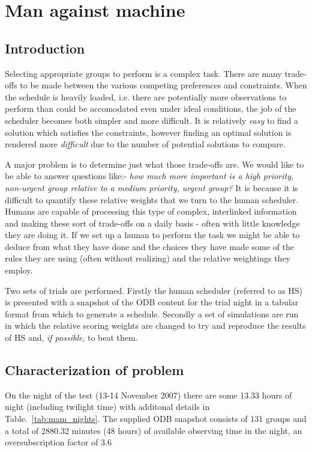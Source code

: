 \section{Man against machine}
\label{sect:mam_study}
\subsection{Introduction}Selecting appropriate groups to perform is a complex task. There are many trade-offs to be made between the various competing preferences and constraints. When the schedule is heavily loaded, i.e. there are potentially more observations to perform than could be accomodated even under ideal conditions, the job of the scheduler becomes both simpler and more difficult. It is relatively \emph{easy} to find a solution which satisfies the constraints, however finding an optimal solution is rendered more \emph{difficult} due to the number of potential solutions to compare. 

A major problem is to determine just what those trade-offs are. We would like to be able to answer questions like:- \emph{how much more important is a high priority, non-urgent group relative to a medium priority, urgent group?} It is because it is difficult to quantify these relative weights that we turn to the human scheduler. Humans are capable of processing this type of complex, interlinked information and making these sort of trade-offs on a daily basis - often with little knowledge they are doing it. If we set up a human to perform the task we might be able to deduce from what they have done and the choices they have made some of the rules they are using (often without realizing) and the relative weightings they employ. 

Two sets of trials are performed. Firstly the human scheduler (referred to as HS) is presented with a snapshot of the ODB content for the trial night in a tabular format from which to generate a schedule. Secondly a set of simulations are run in which the relative scoring weights are changed to try and reproduce the results of HS and, \emph{if possible}, to beat them.

\subsection{Characterization of problem}
On the night of the test (13-14 November 2007) there are some 13.33 hours of night (including twilight time) with additonal details in Table.~\ref{tab:mam_nights}.
The supplied ODB snapshot consists of 131 groups and a total of 2880.32 minutes (48 hours) of available observing time in the night, an oversubscription factor of 3.6

